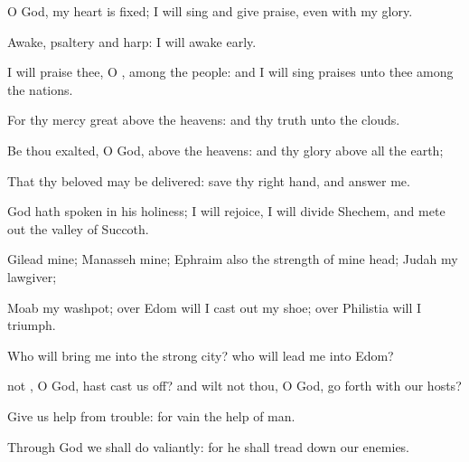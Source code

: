 {\Q {}O
God, my
heart is
fixed; I will
sing and give
praise, even with my
glory.


\par }{\Q {}Awake,
psaltery and
harp: I
{} will
awake
early.


\par }{\Q {}I will
praise thee, O
{}, among the
people: and I will sing
praises unto thee among the
nations.


\par }{\Q {}For thy
mercy
{}
great above the
heavens: and thy
truth
{} unto the
clouds.


\par }{\Q {}Be thou
exalted, O
God, above the
heavens: and thy
glory above all the
earth;


\par }{\BB \par }
{\Q {}That thy
beloved may be
delivered:
save
{} thy right
hand, and
answer me.


\par }{\Q {}God hath
spoken in his
holiness; I will
rejoice, I will
divide
Shechem, and mete
out the
valley of
Succoth.


\par }{\Q {}Gilead
{} mine;
Manasseh
{} mine;
Ephraim also
{} the
strength of mine
head;
Judah
{} my
lawgiver;


\par }{\Q {}Moab
{} my
washpot; over
Edom will I cast
out my
shoe; over
Philistia will I
triumph.


\par }{\Q {}Who will
bring me into the
strong
city? who will
lead me into
Edom?


\par }{\Q {} not
{}, O
God,
{} hast cast us
off? and wilt not thou, O
God, go
forth with our
hosts?


\par }{\Q {}Give us
help from
trouble: for
vain
{} the
help of
man.


\par }{\Q {}Through
God we shall
do
valiantly: for he
{} shall tread
down our
enemies.




\par }
